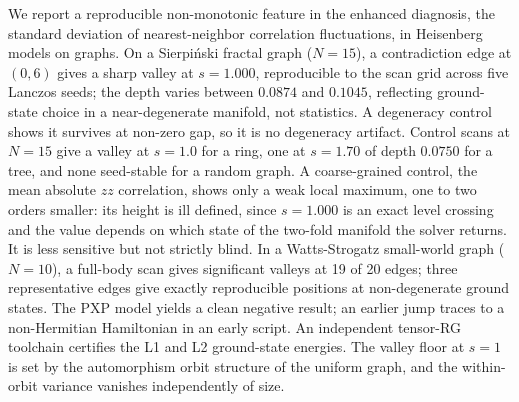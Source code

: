 We report a reproducible non-monotonic feature in the enhanced diagnosis, the standard deviation of nearest-neighbor correlation fluctuations, in Heisenberg models on graphs. On a Sierpi\'{n}ski fractal graph ($N=15$), a contradiction edge at $(0,6)$ gives a sharp valley at $s=1.000$, reproducible to the scan grid across five Lanczos seeds; the depth varies between $0.0874$ and $0.1045$, reflecting ground-state choice in a near-degenerate manifold, not statistics. A degeneracy control shows it survives at non-zero gap, so it is no degeneracy artifact. Control scans at $N=15$ give a valley at $s=1.0$ for a ring, one at $s=1.70$ of depth $0.0750$ for a tree, and none seed-stable for a random graph. A coarse-grained control, the mean absolute $zz$ correlation, shows only a weak local maximum, one to two orders smaller: its height is ill defined, since $s=1.000$ is an exact level crossing and the value depends on which state of the two-fold manifold the solver returns. It is less sensitive but not strictly blind. In a Watts-Strogatz small-world graph ($N=10$), a full-body scan gives significant valleys at 19 of 20 edges; three representative edges give exactly reproducible positions at non-degenerate ground states. The PXP model yields a clean negative result; an earlier jump traces to a non-Hermitian Hamiltonian in an early script. An independent tensor-RG toolchain certifies the L1 and L2 ground-state energies. The valley floor at $s=1$ is set by the automorphism orbit structure of the uniform graph, and the within-orbit variance vanishes independently of size.